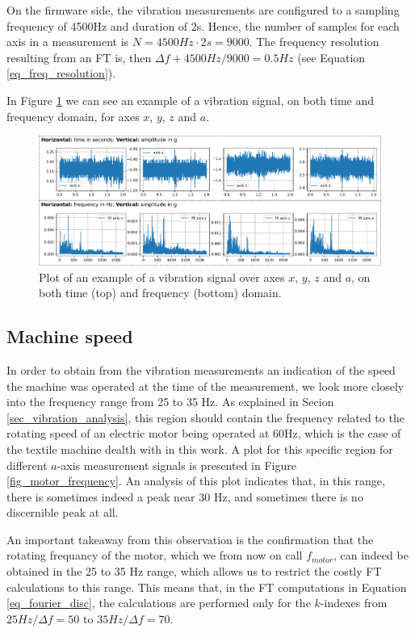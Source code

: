 \documentclass[conference]{IEEEtran}
\begin{document}
On the firmware side, the vibration measurements are configured to a sampling frequency of 4500Hz and duration of 2s. Hence, the number of samples for each axis in a measurement is $N=4500Hz \cdot 2s = 9000$. The frequency resolution resulting from an FT is, then $\Delta f + 4500Hz/9000 = 0.5 Hz$ (see Equation \ref{eq_freq_resolution}).

In Figure \ref{fig_example_signals} we can see an example of a vibration signal, on both time and frequency domain, for axes $x$, $y$, $z$ and $a$.

\begin{figure}[htbp]
\centerline{\includegraphics[width=\columnwidth]{graphics/axes_time_fft/axes_time_fft.pdf}}
\caption{Plot of an example of a vibration signal over axes $x$, $y$, $z$ and $a$, on both time (top) and frequency (bottom) domain.}
\label{fig_example_signals}
\end{figure}


\subsection{Machine speed}
\label{sec_machine_speed}

In order to obtain from the vibration measurements an indication of the speed the machine was operated at the time of the measurement, we look more closely into the frequency range from 25 to 35 Hz. As explained in Secion \ref{sec_vibration_analysis}, this region should contain the frequency related to the rotating speed of an electric motor being operated at 60Hz, which is the case of the textile machine dealth with in this work. A plot for this specific region for different $a$-axis measurement signals is presented in Figure \ref{fig_motor_frequency}. An analysis of this plot indicates that, in this range, there is sometimes indeed a peak near 30 Hz, and sometimes there is no discernible peak at all. 

An important takeaway from this observation is the confirmation that the rotating frequancy of the motor, which we from now on call $f_{motor}$, can indeed be obtained in the 25 to 35 Hz range, which allows us to restrict the costly FT calculations to this range. This means that, in the FT computations in Equation \ref{eq_fourier_disc}, the calculations are performed only for the $k$-indexes from $25Hz/\Delta f = 50$ to $35Hz/\Delta f = 70$.
\end{document}
